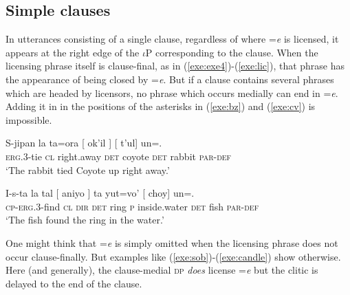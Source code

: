 \documentclass[output=paper,
modfonts
]{LSP/langsci}
\begin{document}
\subsection{Simple clauses}
In utterances consisting of a single clause, regardless of where =\emph{e} is licensed,
it appears at the right edge of the $\iota$P corresponding to the clause.
When the licensing phrase itself is clause-final, as in (\ref{exe:exe4})-(\ref{exe:lic}), that phrase has the appearance 
of being closed by =\emph{e}. 
But if a clause contains several phrases which are headed by licensors, no phrase which occurs medially can end in 
=\emph{e}. Adding it in in the positions of the asterisks in (\ref{exe:bz}) and (\ref{exe:cv}) is impossible.
		\begin{exe}
		\ex\label{exe:bz}\bridgeoverex
		\gll S-jipan la ta=ora [ ok'il ] [ t'ul] un=.\\
		\textsc{erg.3}-tie \textsc{cl} right.away \textsc{det} coyote {} \textsc{det} rabbit  \textsc{par-def} \\
		\glt `The rabbit tied Coyote up right away.'  \citep[160]{laughlin1977} 
		\end{exe}
		\begin{exe}
		\ex\label{exe:cv}\bridgeoverex
		\gll I-s-ta la tal [ aniyo ]  ta yut=vo' [ choy] un=\tikzmarkfullnamed{h}{e}. \\
		\textsc{cp-erg.3}-find \textsc{cl} \textsc{dir} \textsc{det} ring {}  \textsc{p} inside.water \textsc{det} fish \textsc{par-def} \\
		\glt `The fish found the ring in the water.'   \citep[354]{laughlin1977} 
		\bridgeover{e}{f}
		\bridgeover{g}{h}
		\end{exe}
One might think that =\emph{e} is simply omitted when the licensing phrase does not occur clause-finally. But examples like (\ref{exe:sob})-(\ref{exe:candle}) 
show otherwise.  Here (and generally), the clause-medial \textsc{dp} \emph{does} license =\emph{e}  but the clitic 
is delayed to the end of the clause.
\end{document}

